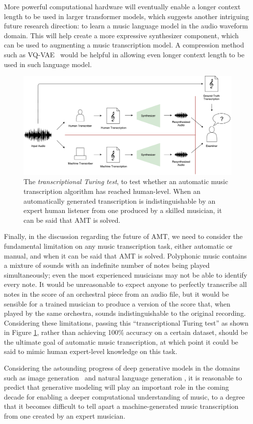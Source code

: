 More powerful computational hardware will eventually enable a longer context length to be used in larger transformer models, which suggests another intriguing future research direction: to learn a music language model in the audio waveform domain.
This will help create a more expressive synthesizer component, which can be used to augmenting a music transcription model.
A compression method such as VQ-VAE~\cite{oord2017vqvae} would be helpful in allowing even longer context length to be used in such language model.

\begin{figure}[b!]
	\includegraphics[width=\textwidth]{turing.pdf}
	\caption{The \emph{transcriptional Turing test}, to test whether an automatic music transcription algorithm has reached human-level. When an automatically generated transcription is indistinguishable by an expert human listener from one produced by a skilled musician, it can be said that AMT is solved.}
	\label{fig:turing}
\end{figure}


Finally, in the discussion regarding the future of AMT, we need to consider the fundamental limitation on any music transcription task, either automatic or manual, and when it can be said that AMT is solved.
Polyphonic music contains a mixture of sounds with an indefinite number of notes being played simultaneously; even the most experienced musicians may not be able to identify every note.
It would be unreasonable to expect anyone to perfectly transcribe all notes in the score of an orchestral piece from an audio file, but it would be sensible for a trained musician to produce a version of the score that, when played by the same orchestra, sounds indistinguishable to the original recording.
Considering these limitations, passing this ``transcriptional Turing test'' as shown in Figure \ref{fig:turing}, rather than achieving 100\% accuracy on a certain dataset, should be the ultimate goal of automatic music transcription, at which point it could be said to mimic human expert-level knowledge on this task.

Considering the astounding progress of deep generative models in the domains such as image generation~\cite{karras2019stylegan} and natural language generation \cite{radford2018gpt}, it is reasonable to predict that generative modeling will play an important role in the coming decade for enabling a deeper computational understanding of music, to a degree that it becomes difficult to tell apart a machine-generated music transcription from one created by an expert musician.

